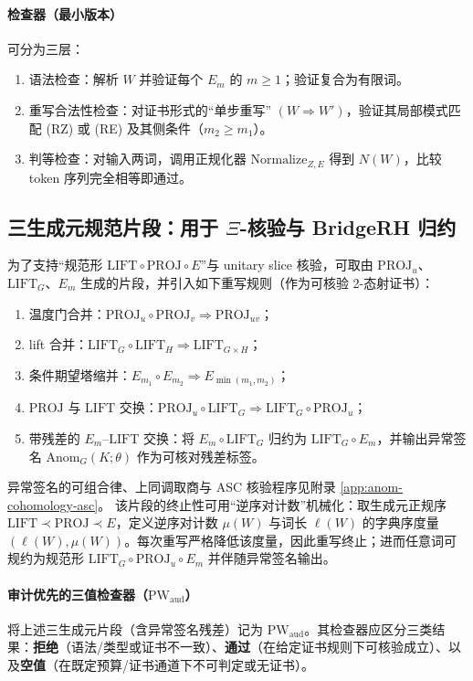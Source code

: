 \paragraph{检查器（最小版本）} 可分为三层：
\begin{enumerate}
  \item 语法检查：解析 $W$ 并验证每个 $E_m$ 的 $m\ge 1$；验证复合为有限词。
  \item 重写合法性检查：对证书形式的“单步重写” $(W\Rightarrow W')$，验证其局部模式匹配 (RZ) 或 (RE) 及其侧条件（$m_2\ge m_1$）。
  \item 判等检查：对输入两词，调用正规化器 $\mathrm{Normalize}_{Z,E}$ 得到 $N(W)$，比较 token 序列完全相等即通过。
\end{enumerate}

\subsection{三生成元规范片段：用于 \texorpdfstring{$\Xi$}{Xi}-核验与 BridgeRH 归约}
为了支持“规范形 $\mathrm{LIFT}\circ\mathrm{PROJ}\circ E$”与 unitary slice 核验，可取由 $\mathrm{PROJ}_u$、$\mathrm{LIFT}_G$、$E_m$ 生成的片段，并引入如下重写规则（作为可核验 2-态射证书）：
\begin{enumerate}
  \item[(RPROJ)] 温度门合并：$\mathrm{PROJ}_u\circ\mathrm{PROJ}_v\Rightarrow \mathrm{PROJ}_{uv}$；
  \item[(RLIFT)] lift 合并：$\mathrm{LIFT}_G\circ\mathrm{LIFT}_H\Rightarrow \mathrm{LIFT}_{G\times H}$；
  \item[(RE)] 条件期望塔缩并：$E_{m_1}\circ E_{m_2}\Rightarrow E_{\min(m_1,m_2)}$；
  \item[(RPL)] $\mathrm{PROJ}$ 与 $\mathrm{LIFT}$ 交换：$\mathrm{PROJ}_u\circ \mathrm{LIFT}_G\Rightarrow \mathrm{LIFT}_G\circ\mathrm{PROJ}_u$；
  \item[(RELIFT)] 带残差的 $E_m$–$\mathrm{LIFT}$ 交换：将 $E_m\circ\mathrm{LIFT}_G$ 归约为 $\mathrm{LIFT}_G\circ E_m$，并输出异常签名 $\mathrm{Anom}_G(K;\theta)$ 作为可核对残差标签。
\end{enumerate}
异常签名的可组合律、上同调取商与 ASC 核验程序见附录 \ref{app:anom-cohomology-asc}。
该片段的终止性可用“逆序对计数”机械化：取生成元正规序 $\mathrm{LIFT}\prec\mathrm{PROJ}\prec E$，定义逆序对计数 $\mu(W)$ 与词长 $\ell(W)$ 的字典序度量 $(\ell(W),\mu(W))$。每次重写严格降低该度量，因此重写终止；进而任意词可规约为规范形 $\mathrm{LIFT}_G\circ\mathrm{PROJ}_u\circ E_m$ 并伴随异常签名输出。

\paragraph{审计优先的三值检查器（\texorpdfstring{$\mathrm{PW}_{\mathrm{aud}}$}{PW\_aud}）}
将上述三生成元片段（含异常签名残差）记为 $\mathrm{PW}_{\mathrm{aud}}$。其检查器应区分三类结果：\textbf{拒绝}（语法/类型或证书不一致）、\textbf{通过}（在给定证书规则下可核验成立）、以及\textbf{空值}（在既定预算/证书通道下不可判定或无证书）。

